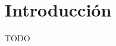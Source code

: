 \chapter{Introducción}\label{ch:introduccion}
\thispagestyle{empty}

\vspace{50pt}

\begin{adjustwidth}{50pt}{50pt}
    TODO
\end{adjustwidth}

\clearpage
\newpage
\thispagestyle{empty}
\mbox{}
\newpage








